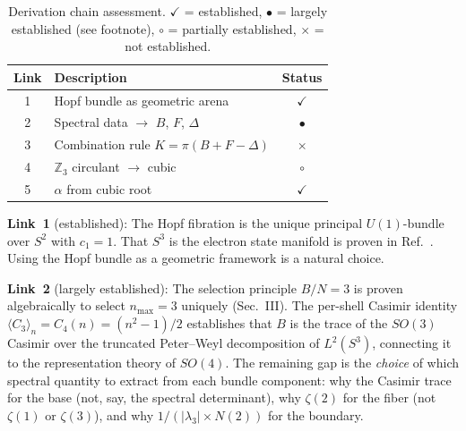 \documentclass[aps,prl,twocolumn,superscriptaddress]{revtex4-2}
\begin{document}
\begin{table}[h]
\centering
\begin{tabular}{clc}
\hline\hline
Link & Description & Status \\
\hline
1 & Hopf bundle as geometric arena & $\checkmark$ \\
2 & Spectral data $\to$ $B$, $F$, $\Delta$ & $\bullet$\footnotemark[1] \\
3 & Combination rule $K = \pi(B+F-\Delta)$ & $\times$ \\
4 & $\mathbb{Z}_3$ circulant $\to$ cubic & $\circ$\footnotemark[2] \\
5 & $\alpha$ from cubic root & $\checkmark$ \\
\hline\hline
\end{tabular}
\caption{Derivation chain assessment.
$\checkmark$ = established,
$\bullet$ = largely established (see footnote),
$\circ$ = partially established,
$\times$ = not established.}
\label{tab:chain}
\end{table}

\textbf{Link~1} (established): The Hopf fibration is the unique
principal $U(1)$-bundle over $S^2$ with $c_1 = 1$. That $S^3$ is the
electron state manifold is proven in Ref.~\cite{paper7}. Using the
Hopf bundle as a geometric framework is a natural choice.

\textbf{Link~2} (largely established): The selection principle
$B/N = 3$ is proven algebraically to select $n_{\max} = 3$ uniquely
(Sec.~III). The per-shell Casimir identity
$\langle C_3\rangle_n = C_4(n) = (n^2-1)/2$ establishes that $B$ is
the trace of the $SO(3)$ Casimir over the truncated Peter--Weyl
decomposition of $L^2(S^3)$, connecting it to the representation
theory of $SO(4)$. The remaining gap is the \textit{choice} of which
spectral quantity to extract from each bundle component: why the
Casimir trace for the base (not, say, the spectral determinant), why
$\zeta(2)$ for the fiber (not $\zeta(1)$ or $\zeta(3)$), and why
$1/(|\lambda_3| \times N(2))$ for the boundary.
\end{document}
